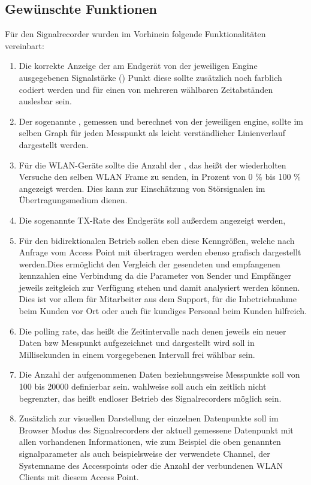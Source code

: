 \subsection{Gewünschte Funktionen}
Für den Signalrecorder wurden im Vorhinein folgende Funktionalitäten vereinbart: \\
\begin{enumerate}
        \item Die korrekte Anzeige der am Endgerät von der jeweiligen Engine ausgegebenen Signalstärke () Punkt diese sollte zusätzlich noch farblich codiert werden und für einen von mehreren wählbaren Zeitabständen auslesbar sein.
        \item Der sogenannte ,  gemessen und berechnet von der jeweiligen engine, sollte im selben Graph für jeden Messpunkt als leicht verständlicher Linienverlauf dargestellt werden.
        \item Für die WLAN-Geräte sollte die Anzahl der , das heißt der wiederholten Versuche den selben WLAN Frame zu senden, in Prozent von 0 \% bis 100 \% angezeigt werden. Dies kann zur Einschätzung von Störsignalen im Übertragungsmedium dienen.
        \item Die sogenannte TX-Rate des Endgeräts soll außerdem angezeigt werden,
        \item Für den bidirektionalen Betrieb sollen eben diese Kenngrößen, welche nach Anfrage vom Access Point mit übertragen werden  ebenso grafisch dargestellt werden.Dies ermöglicht den Vergleich der gesendeten und empfangenen kennzahlen eine Verbindung da die Parameter von Sender und Empfänger jeweils zeitgleich zur Verfügung stehen und damit analysiert werden können.  Dies ist vor allem für Mitarbeiter aus dem Support, für die Inbetriebnahme beim Kunden vor Ort oder auch für kundiges Personal beim Kunden hilfreich.
        \item Die polling rate, das heißt die Zeitintervalle nach denen jeweils ein neuer Daten bzw Messpunkt aufgezeichnet und dargestellt wird soll in Millisekunden in einem vorgegebenen Intervall frei wählbar sein.
        \item Die Anzahl der aufgenommenen Daten beziehungsweise Messpunkte soll von 100 bis 20000  definierbar sein. wahlweise soll auch ein zeitlich nicht begrenzter, das heißt endloser Betrieb des Signalrecorders möglich sein.
        \item Zusätzlich zur visuellen Darstellung der einzelnen Datenpunkte soll im Browser Modus des Signalrecorders der aktuell gemessene Datenpunkt mit allen vorhandenen Informationen, wie zum Beispiel die oben genannten signalparameter als auch beispielsweise der verwendete Channel, der Systemname des Accesspoints  oder die Anzahl der verbundenen WLAN Clients mit diesem Access Point.

\end{enumerate}
